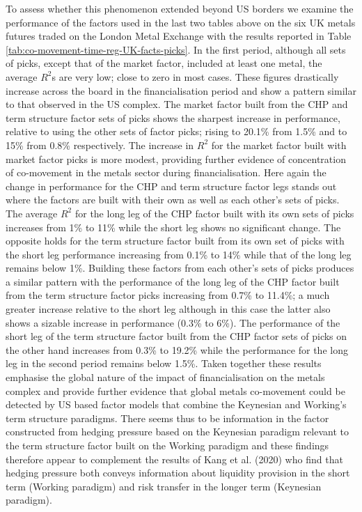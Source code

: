 \documentclass[]{elsarticle} %
\begin{document}
To assess whether this phenomenon extended beyond US borders we examine the performance of the factors used in the last two tables above on the six UK metals futures traded on the London Metal Exchange with the results reported in Table \ref{tab:co-movement-time-reg-UK-facts-picks}. In the first period, although all sets of picks, except that of the market factor, included at least one metal, the average \(R^{2}\)s are very low; close to zero in most cases. These figures drastically increase across the board in the financialisation period and show a pattern similar to that observed in the US complex. The market factor built from the CHP and term structure factor sets of picks shows the sharpest increase in performance, relative to using the other sets of factor picks; rising to 20.1\% from 1.5\% and to 15\% from 0.8\% respectively. The increase in \(R^{2}\) for the market factor built with market factor picks is more modest, providing further evidence of concentration of co-movement in the metals sector during financialisation. Here again the change in performance for the CHP and term structure factor legs stands out where the factors are built with their own as well as each other's sets of picks. The average \(R^{2}\) for the long leg of the CHP factor built with its own sets of picks increases from 1\% to 11\% while the short leg shows no significant change. The opposite holds for the term structure factor built from its own set of picks with the short leg performance increasing from 0.1\% to 14\% while that of the long leg remains below 1\%. Building these factors from each other's sets of picks produces a similar pattern with the performance of the long leg of the CHP factor built from the term structure factor picks increasing from 0.7\% to 11.4\%; a much greater increase relative to the short leg although in this case the latter also shows a sizable increase in performance (0.3\% to 6\%). The performance of the short leg of the term structure factor built from the CHP factor sets of picks on the other hand increases from 0.3\% to 19.2\% while the performance for the long leg in the second period remains below 1.5\%. Taken together these results emphasise the global nature of the impact of financialisation on the metals complex and provide further evidence that global metals co-movement could be detected by US based factor models that combine the Keynesian and Working's term structure paradigms. There seems thus to be information in the factor constructed from hedging pressure based on the Keynesian paradigm relevant to the term structure factor built on the Working paradigm and these findings therefore appear to complement the results of Kang et al. (2020) who find that hedging pressure both conveys information about liquidity provision in the short term (Working paradigm) and risk transfer in the longer term (Keynesian paradigm).
\end{document}
